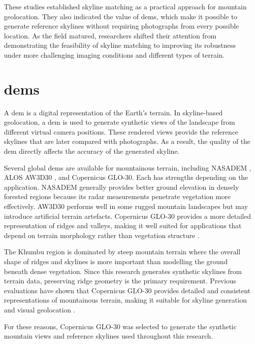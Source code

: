 These studies established skyline matching as a practical approach for mountain geolocation. They also indicated the value of \Glspl{dem}, which make it possible to generate reference skylines without requiring photographs from every possible location. As the field matured, researchers shifted their attention from demonstrating the feasibility of skyline matching to improving its robustness under more challenging imaging conditions and different types of terrain.

\section{\Glspl{dem}}

A \Gls{dem} is a digital representation of the Earth's terrain. In skyline-based geolocation, a \Gls{dem} is used to generate synthetic views of the landscape from different virtual camera positions. These rendered views provide the reference skylines that are later compared with photographs. As a result, the quality of the \Gls{dem} directly affects the accuracy of the generated skyline.

Several global \Glspl{dem} are available for mountainous terrain, including NASADEM \cite{crippen2016nasadem}, ALOS AW3D30 \cite{tadono2014alos}, and Copernicus GLO-30. Each has strengths depending on the application. NASADEM generally provides better ground elevation in densely forested regions because its radar measurements penetrate vegetation more effectively. AW3D30 performs well in some rugged mountain landscapes but may introduce artificial terrain artefacts. Copernicus GLO-30 provides a more detailed representation of ridges and valleys, making it well suited for applications that depend on terrain morphology rather than vegetation structure \cite{Li2022}.

The Khumbu region is dominated by steep mountain terrain where the overall shape of ridges and skylines is more important than modelling the ground beneath dense vegetation. Since this research generates synthetic skylines from terrain data, preserving ridge geometry is the primary requirement. Previous evaluations have shown that Copernicus GLO-30 provides detailed and consistent representations of mountainous terrain, making it suitable for skyline generation and visual geolocation \cite{Li2022}.

For these reasons, Copernicus GLO-30 was selected to generate the synthetic mountain views and reference skylines used throughout this research.

